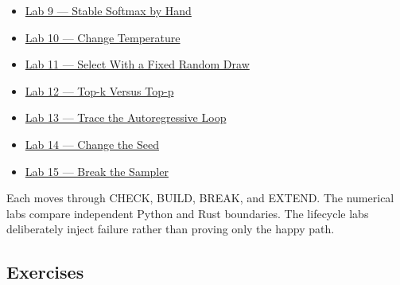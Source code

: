 \documentclass[
  10pt,
]{article}
\providecommand{\tightlist}{%
  \setlength{\itemsep}{0pt}\setlength{\parskip}{0pt}}
\begin{document}
\begin{itemize}
\tightlist
\item
  \href{https://github.com/hermonai/inside-the-llm-engine/blob/astra-visual-rewrite/labs/lab-09-stable-softmax-by-hand.md}{Lab
  9 --- Stable Softmax by Hand}
\item
  \href{https://github.com/hermonai/inside-the-llm-engine/blob/astra-visual-rewrite/labs/lab-10-temperature.md}{Lab
  10 --- Change Temperature}
\item
  \href{https://github.com/hermonai/inside-the-llm-engine/blob/astra-visual-rewrite/labs/lab-11-fixed-categorical-draw.md}{Lab
  11 --- Select With a Fixed Random Draw}
\item
  \href{https://github.com/hermonai/inside-the-llm-engine/blob/astra-visual-rewrite/labs/lab-12-top-k-vs-top-p.md}{Lab
  12 --- Top-k Versus Top-p}
\item
  \href{https://github.com/hermonai/inside-the-llm-engine/blob/astra-visual-rewrite/labs/lab-13-build-the-autoregressive-loop.md}{Lab
  13 --- Trace the Autoregressive Loop}
\item
  \href{https://github.com/hermonai/inside-the-llm-engine/blob/astra-visual-rewrite/labs/lab-14-change-the-seed.md}{Lab
  14 --- Change the Seed}
\item
  \href{https://github.com/hermonai/inside-the-llm-engine/blob/astra-visual-rewrite/labs/lab-15-break-the-sampler.md}{Lab
  15 --- Break the Sampler}
\end{itemize}

Each moves through CHECK, BUILD, BREAK, and EXTEND. The numerical labs
compare independent Python and Rust boundaries. The lifecycle labs
deliberately inject failure rather than proving only the happy path.

\subsection{Exercises}\label{exercises-3}
\end{document}
